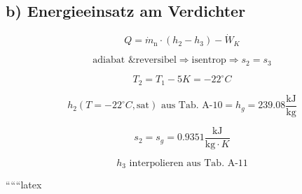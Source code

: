 \subsection*{b) Energieeinsatz am Verdichter}

\[
Q = \dot{m}_{\text{n}} \cdot (h_2 - h_3) - \dot{W}_K
\]

\[
\text{adiabat \& reversibel} \Rightarrow \text{isentrop} \Rightarrow s_2 = s_3
\]

\[
T_2 = T_1 - 5K = -22^\circ C
\]

\[
h_2 (T = -22^\circ C, \text{sat}) \text{ aus Tab. A-10} = h_g = 239.08 \frac{\text{kJ}}{\text{kg}}
\]

\[
s_2 = s_g = 0.9351 \frac{\text{kJ}}{\text{kg} \cdot K}
\]

\[
h_3 \text{ interpolieren aus Tab. A-11}
\]

``````latex